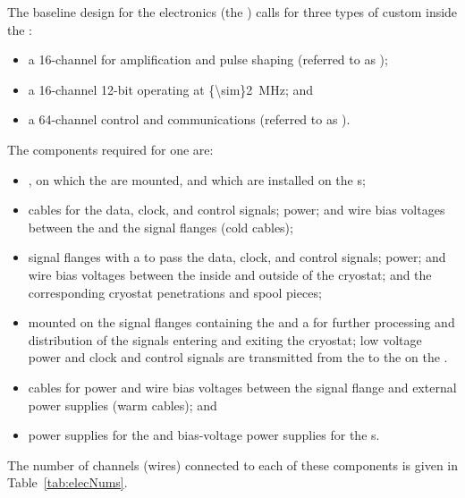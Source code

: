 The baseline design for the   electronics (the ) calls for three 
types of custom  inside  the :
\begin{itemize}
\item{a \num{16}-channel   for amplification 
and pulse shaping (referred to as );}
\item{a \num{16}-channel \num{12}-bit   
operating at \SI{{\sim}2}{MHz}; and}
\item{a \num{64}-channel control and communications  
(referred to as ).}
\end{itemize}

The  components %
required for one  are: 
\begin{itemize}
\item{, on which the  are mounted, and 
which are installed on the s;}
\item{cables for the data, clock, and control signals;  
power; and wire bias voltages between the  and the 
signal flanges (cold cables);}
\item{signal flanges with a  \fdth to pass the data, clock, 
and control signals;  power; and  wire bias 
voltages between the inside and outside of the cryostat; and 
the corresponding cryostat penetrations and spool pieces;}
\item{ mounted on the signal flanges 
containing the  and a  for further processing
and distribution of the signals entering and exiting the cryostat;
low voltage power and clock and control signals are transmitted
from the  to the  on 
the .}
\item{cables for  power and wire bias voltages between 
the signal flange and external power supplies (warm cables); and}
\item{ power supplies for the  and bias-voltage 
power supplies for the s.}
\end{itemize}

The number of channels (wires) connected to each of these
components is given in Table~\ref{tab:elecNums}.

